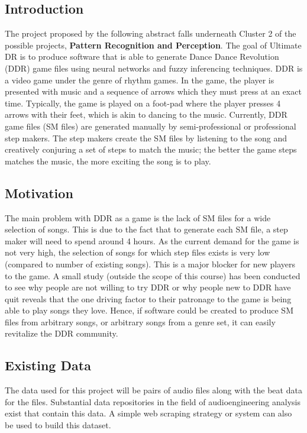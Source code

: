 \subsection{Introduction}
The project proposed by the following abstract falls underneath Cluster 2 of the possible projects, \textbf{Pattern Recognition and
Perception}. The goal of Ultimate DR is to produce software that is able to generate Dance Dance Revolution (DDR) game
files using neural networks and fuzzy inferencing techniques.
DDR is a video game under the genre of rhythm games. In the game,
the player is presented with music and a sequence of arrows which they must press at an exact
time. Typically, the game is played on a foot-pad where the player presses 4 arrows with their
feet, which is akin to dancing to the music. Currently, DDR game files (SM files) are generated
manually by semi-professional or professional step makers. The step makers create the SM files
by listening to the song and creatively conjuring a set of steps to match the music; the better
the game steps matches the music, the more exciting the song is to play.


\subsection{Motivation}
The main problem with DDR as a game is the lack of SM files for a wide selection of songs. This
is due to the fact that to generate each SM file, a step maker will need to spend around 4 hours.
As the current demand for the game is not very high, the selection of songs for which step files
exists is very low (compared to number of existing songs). This is a major blocker for new
players to the game. A small study (outside the scope of this course) has been conducted to see
why people are not willing to try DDR or why people new to DDR have quit reveals that the one
driving factor to their patronage to the game is being able to play songs they love. Hence, if
software could be created to produce SM files from arbitrary songs, or arbitrary songs from a
genre set, it can easily revitalize the DDR community.

\subsection{Existing Data}
The data used for this project will be pairs of audio files along with the beat data for the files. Substantial data repositories in the field of audioengineering analysis exist that contain this data. A simple web scraping strategy or system can also be used to build this dataset. 

